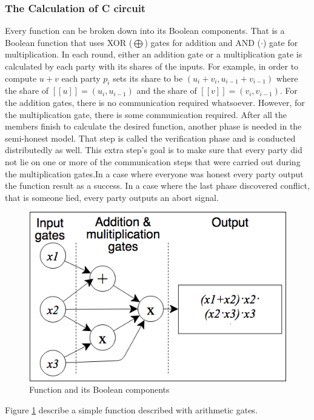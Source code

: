 \documentclass[12pt]{article}
\begin{document}
\subsubsection{The Calculation of C circuit}
Every function can be broken down into its Boolean components. That is a Boolean function that uses XOR ($\bigoplus$) gates for addition and AND ($\cdot$) gate for multiplication.\hfill\break
In each round, either an addition gate or a multiplication gate is calculated by each party with its shares of the inputs. For example, in order to compute $u+v$ each party $p_i$ sets its share to be $(u_i+v_i, u_{i-1}+v_{i-1})$ where the share of $[[u]] = (u_i, u_{i-1})$ and the share of $[[v]] = (v_i, v_{i-1})$.
For the addition gates, there is no communication required whatsoever. However, for the multiplication gate, there is some communication required. After all the members finish to calculate the desired function, another phase is needed in the semi-honest model. That step is called the verification phase and is conducted distributedly as well. This extra step’s goal is to make sure that every party did not lie on one or more of the communication steps that were carried out during the multiplication gates.In a case where everyone was honest every party output the function result as a success. In a case where the last phase discovered conflict, that is someone lied, every party outputs an abort signal.

\hfill\break
\begin{figure}[h!]
	\centering
	\includegraphics[width=0.45\linewidth]{"../Figures/ArithmiticCircuit"}
	\caption{Function and its Boolean components}
	\label{fig:arithmiticcircuit}
\end{figure}

\hfill\break
Figure \ref{fig:arithmiticcircuit} describe a simple function described with arithmetic gates.

\pagebreak
\end{document}
